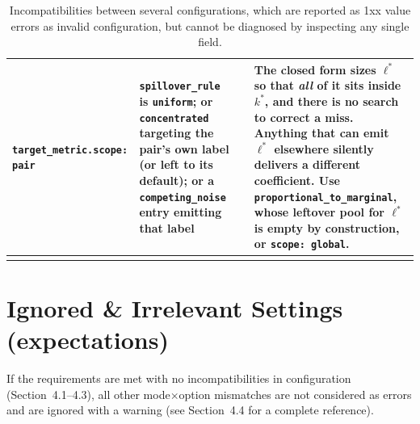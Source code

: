 \documentclass[a4paper,11pt]{article}
\newcommand{\vcode}[1]{\textcolor{valred}{\bfseries\ttfamily #1}}
\begin{document}
\begin{longtable}{@{}L{3.4cm} L{4.6cm} L{1.2cm} L{6.4cm}@{}}
\texttt{target\_metric.}\newline \texttt{scope: pair} & \texttt{spillover\_rule} is \texttt{uniform}; or \texttt{concentrated} targeting the pair's own label (or left to its default); or a \texttt{competing\_noise} entry emitting that label & \vcode{130} & The closed form sizes $\ell^*$ so that \emph{all} of it sits inside $k^*$, and there is no search to correct a miss. Anything that can emit $\ell^*$ elsewhere silently delivers a different coefficient. Use \texttt{proportional\_to\_marginal}, whose leftover pool for $\ell^*$ is empty by construction, or \texttt{scope: global}. \\
\bottomrule
\caption{Incompatibilities between several configurations, which are reported as 1xx value errors as invalid configuration, but cannot be diagnosed by inspecting any single field.}
\end{longtable}

\newpage

\section{Ignored \& Irrelevant Settings (expectations)}
If the requirements are met with no incompatibilities in configuration (Section~4.1--4.3), all other mode$\times$option mismatches are not considered as errors and are ignored with a warning (see Section~4.4 for a complete reference).
\end{document}
